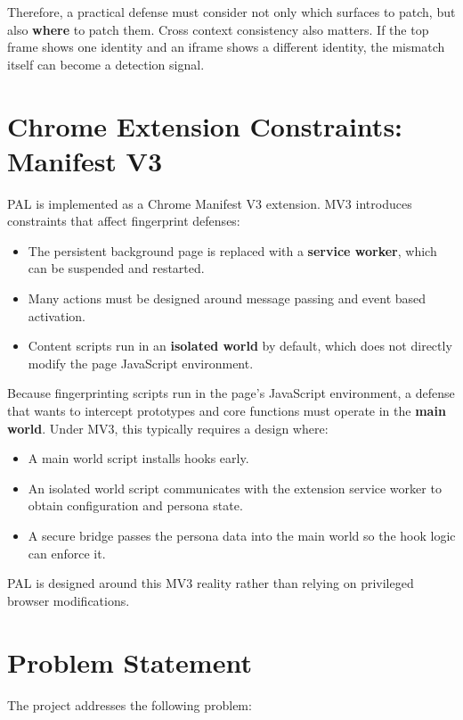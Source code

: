 \documentclass[11pt]{report}
\begin{document}
Therefore, a practical defense must consider not only which surfaces to patch, but also \textbf{where} to patch them. Cross context consistency also matters. If the top frame shows one identity and an iframe shows a different identity, the mismatch itself can become a detection signal.

\section{Chrome Extension Constraints: Manifest V3}

PAL is implemented as a Chrome Manifest V3 extension. MV3 introduces constraints that affect fingerprint defenses:

\begin{itemize}
    \item The persistent background page is replaced with a \textbf{service worker}, which can be suspended and restarted.
    \item Many actions must be designed around message passing and event based activation.
    \item Content scripts run in an \textbf{isolated world} by default, which does not directly modify the page JavaScript environment.
\end{itemize}

Because fingerprinting scripts run in the page's JavaScript environment, a defense that wants to intercept prototypes and core functions must operate in the \textbf{main world}. Under MV3, this typically requires a design where:

\begin{itemize}
    \item A main world script installs hooks early.
    \item An isolated world script communicates with the extension service worker to obtain configuration and persona state.
    \item A secure bridge passes the persona data into the main world so the hook logic can enforce it.
\end{itemize}

PAL is designed around this MV3 reality rather than relying on privileged browser modifications.

\section{Problem Statement}

The project addresses the following problem:
\end{document}
